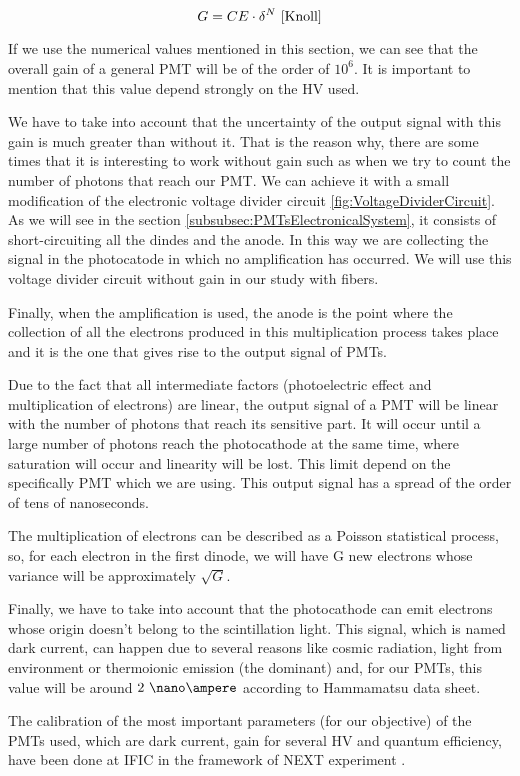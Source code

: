 \begin{itemize}
\begin{equation}
G = CE\cdot{} \delta^N~\cite{Knoll}
\label{eq:PMTGain}
\end{equation}

If we use the numerical values mentioned in this section, we can see that the overall gain of a general PMT will be of the order of $10^6$. It is important to mention that this value depend strongly on the HV used.

We have to take into account that the uncertainty of the output signal with this gain is much greater than without it. That is the reason why, there are some times that it is interesting to work without gain such as when we try to count the number of photons that reach our PMT. We can achieve it with a small modification of the electronic voltage divider circuit \ref{fig:VoltageDividerCircuit}. As we will see in the section \ref{subsubsec:PMTsElectronicalSystem}, it consists of short-circuiting all the dindes and the anode. In this way we are collecting the signal in the photocatode in which no amplification has occurred. We will use this voltage divider circuit without gain in our study with fibers.

Finally, when the amplification is used, the anode is the point where the collection of all the electrons produced in this multiplication process takes place and it is the one that gives rise to the output signal of PMTs. 

\end{itemize}

Due to the fact that all intermediate factors (photoelectric effect and multiplication of electrons) are linear, the output signal of a PMT will be linear with the number of photons that reach its sensitive part. It will occur until a large number of photons reach the photocathode at the same time, where saturation will occur and linearity will be lost. This limit depend on the specifically PMT which we are using. This output signal has a spread of the order of tens of nanoseconds.

The multiplication of electrons can be described as a Poisson statistical process, so, for each electron in the first dinode, we will have G new electrons whose variance will be approximately $\sqrt{G}$.

Finally, we have to take into account that the photocathode can emit electrons whose origin doesn't belong to the scintillation light. This signal, which is named dark current, can  happen due to several reasons like cosmic radiation, light from environment or thermoionic emission (the dominant) and, for our PMTs, this value will be around $2~\nano\ampere$ according to Hammamatsu data sheet.

The calibration of the most important parameters (for our objective) of the PMTs used, which are dark current, gain for several HV and quantum efficiency,  have been done at IFIC in the framework of NEXT experiment \cite{CalibrationPMTsNEXT}. 
